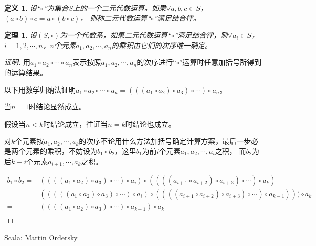 \documentclass{article}
\newtheorem{Def}{定义}
\newtheorem{Thm}{定理}
\begin{document}
\begin{CJK*}{UTF8}{gbsn}
  \begin{Def}
    设“$\circ$”为集合$S$上的一个二元代数运算。如果$\forall a, b, c \in S$，$(a \circ b) \circ c = a \circ (b \circ c)$， 则称二元代数运算“$\circ$”满足结合律。
  \end{Def}
\begin{Thm}
  设$(S,\circ)$为一个代数系，如果二元代数运算“$\circ$”满足结合律，则$\forall a_i\in S$，$i=1,2,\cdots,n$，$n$个元素$a_1,a_2,\cdots,a_n$的乘积由它们的次序唯一确定。
\end{Thm}
\begin{proof}[证明]
  用$a_1\circ a_2\circ \cdots \circ a_n$表示按照$a_1,a_2, \cdots, a_n$的次序进行“$\circ$”运算时任意加括号所得到的运算结果。

  以下用数学归纳法证明$a_1\circ a_2\circ \cdots \circ a_n=(((a_1\circ a_2)\circ a_3)\circ \cdots )\circ a_n$。

  当$n=1$时结论显然成立。

  假设当$n<k$时结论成立，往证当$n=k$时结论也成立。

  对$k$个元素按$a_1,a_2,\cdots,a_k$的次序不论用什么方法加括号确定计算方案，最后一步必是两个元素的乘积，不妨设为$b_1\circ b_2$，这里$b_1$为前$i$个元素$a_1,a_2,\cdots,a_i$之积，
  而$b_2$为后$k-i$个元素$a_{i+1},\cdots,a_k$之积。

  \begin{align*}
    b_1\circ b_2 = &((((a_1\circ a_2)\circ a_3)\circ \cdots )\circ a_i)\circ ((((a_{i+1}\circ a_{i+2})\circ a_{i+3})\circ \cdots )\circ a_k)\\
                = &(((((a_1\circ a_2)\circ a_3)\circ \cdots )\circ a_i)\circ ((((a_{i+1}\circ a_{i+2})\circ a_{i+3})\circ \cdots )\circ a_{k-1})))\circ a_k\\
                =&((((a_1\circ a_2)\circ a_3)\circ \cdots )\circ a_{k-1})\circ a_k\\
  \end{align*}
\end{proof}

Scala: Martin Ordersky


\end{CJK*}
\end{document}

